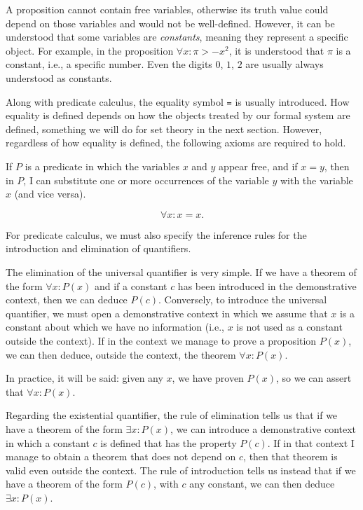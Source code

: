 A proposition cannot contain free variables, otherwise its truth value could
depend on those variables and would not be well-defined.
%
%
However, it can be understood that some variables are \emph{constants}, meaning
they represent a specific object. For example, in the proposition $\forall x:
\pi > -x^2$, it is understood that $\pi$ is a constant, i.e., a specific number.
Even the digits $0$, $1$, $2$ are usually always understood as constants.

Along with predicate calculus, the equality symbol \texttt{=} is usually
introduced. How equality is defined depends on how the objects treated by our
formal system are defined, something we will do for set theory in the next
section. However, regardless of how equality is defined, the following axioms
are required to hold.

\begin{axiom}[extensionality]
If $P$ is a predicate in which the variables $x$ and $y$ appear free, and if
$x=y$, then in $P$, I can substitute one or more occurrences of the variable $y$
with the variable $x$ (and vice versa).
\end{axiom}

\begin{axiom}[equality]
\[
  \forall x\colon x=x.  
\]
\end{axiom}

For predicate calculus, we must also specify the inference rules for the
introduction and elimination of quantifiers.

%
%
The elimination of the universal quantifier is very simple. If we have a theorem
of the form $\forall x\colon P(x)$ and if a constant $c$ has been introduced in
the demonstrative context, then we can deduce $P(c)$.
%
Conversely, to introduce the universal quantifier, we must open a demonstrative
context in which we assume that $x$ is a constant about which we have no
information (i.e., $x$ is not used as a constant outside the context). If in the
context we manage to prove a proposition $P(x)$, we can then deduce, outside the
context, the theorem $\forall x\colon P(x)$.

In practice, it will be said: given any $x$, we have proven $P(x)$, so we can
assert that $\forall x\colon P(x)$.

%
%
Regarding the existential quantifier, the rule of elimination tells us that if
we have a theorem of the form $\exists x\colon P(x)$, we can introduce a
demonstrative context in which a constant $c$ is defined that has the property
$P(c)$. If in that context I manage to obtain a theorem that does not depend on
$c$, then that theorem is valid even outside the context.
%
The rule of introduction tells us instead that if we have a theorem of the form
$P(c)$, with $c$ any constant, we can then deduce $\exists x\colon P(x)$.


